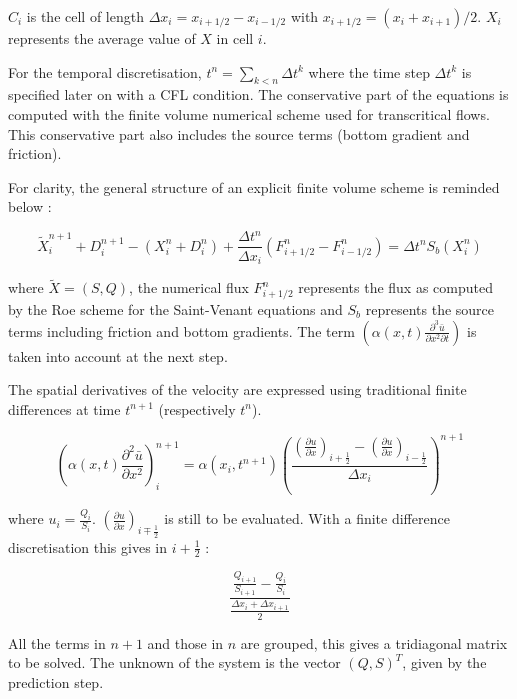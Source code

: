 $C_i$ is the cell of length $\Delta x_i=x_{i+1/2}-x_{i-1/2}$ with $x_{i+1/2}=(x_i+x_{i+1})/2$.
$X_i$ represents the average value of $X$ in cell $i$.

For the temporal discretisation, $t^n = \sum_{k < n} \Delta t^k$ where the time step $\Delta t^k$ is specified later on with a CFL condition.
The conservative part of the equations is computed with the finite volume numerical scheme used for transcritical flows. This conservative part also includes the source terms (bottom gradient and friction).

For clarity, the general structure of an explicit finite volume scheme is reminded below :

\begin{equation}
 \tilde{X}^{n+1}_i + D_i^{n+1} - \left(X^n_i + D_i^n\right) + \frac{\Delta t^n}{\Delta x_i}\left(F^n_{i+1/2} - F^n_{i-1/2}\right) = \Delta t^n S_b(X^n_i) \label{eq:model_dis}
\end{equation}

where $\tilde{X}=(S,Q)$, the numerical flux $F^n_{i+1/2}$ represents the flux as computed by the Roe scheme for the Saint-Venant equations and $S_b$ represents the source terms including friction and bottom gradients.
The term $\left(\alpha(x,t)\frac{\partial^3{\bar{u}}}{\partial{{x}^2}\partial{t}}\right)$ is taken into account at the next step.

The spatial derivatives of the velocity are expressed using traditional finite differences at time $t^{n+1}$ (respectively $t^n$).

\begin{equation}
\left(\alpha(x,t)\frac{\partial^2{\bar{u}}}{\partial{{x}^2}}\right)^{n+1}_{i}
=\alpha(x_i,t^{n+1})\left(\frac{\displaystyle \left(\frac{\partial{u}}{\partial{x}}\right)_{i+\frac{1}{2}}-\left(\frac{\partial{u}}{\partial{x}}\right)_{i-\frac{1}{2}}}{\Delta{x_i}}\right)^{n+1}
\end{equation}

where $u_i=\frac{Q_i}{S_i}$. $\left(\frac{\partial{u}}{\partial{x}}\right)_{i\mp\frac{1}{2}}$ is still to be evaluated. With a finite difference discretisation this gives in $i+\frac{1}{2}$ :

\begin{equation}
\frac{\displaystyle \frac{Q_{i+1}}{S_{i+1}}-\frac{Q_i}{S_i}}{\displaystyle \frac{\Delta{x_i}+\Delta{x_{i+1}}}{2}}
\end{equation}

All the terms in $n+1$ and those in $n$ are grouped, this gives a tridiagonal matrix to be solved.
The unknown of the system is the vector $(Q,S)^T$, given by the prediction step.


